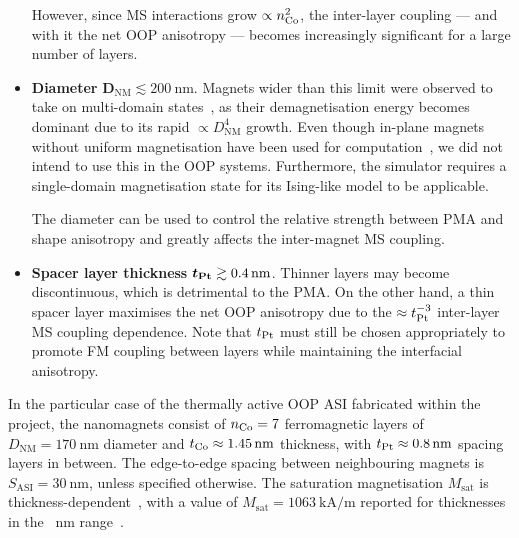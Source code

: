 \begin{itemize}
	However, since MS interactions grow $\propto n_{\ce{Co}}^2$, the inter-layer coupling --- and with it the net OOP anisotropy --- becomes increasingly significant for a large number of layers.
	\item \textbf{Diameter} $\boldsymbol{D_\mathrm{NM}} \lesssim \SI{200}{\nano\metre}$. \newline
	Magnets wider than this limit were observed to take on multi-domain states~\cite{KUR-24}, as their demagnetisation energy becomes dominant due to its rapid $\propto D_\mathrm{NM}^4$ growth.
	Even though in-plane magnets without uniform magnetisation have been used for computation~\cite{gartside2022reconfigurable}, we did not intend to use this in the OOP systems.
	Furthermore, the \hotspice simulator requires a single-domain magnetisation state for its Ising-like model to be applicable. \par
	The diameter can be used to control the relative strength between PMA and shape anisotropy and greatly affects the inter-magnet MS coupling.
	\item \textbf{Spacer layer thickness} $\boldsymbol{t_{\ce{Pt}}} \gtrsim \SI{0.4}{\nano\metre}$. \newline
	Thinner layers may become discontinuous, which is detrimental to the PMA.
	On the other hand, a thin spacer layer maximises the net OOP anisotropy due to the $\approx t_{\ce{Pt}}^{-3}$ inter-layer MS coupling dependence.
	Note that $t_{\ce{Pt}}$ must still be chosen appropriately to promote FM coupling between layers while maintaining the interfacial anisotropy. %
\end{itemize}

In the particular case of the thermally active OOP ASI fabricated within the \spinengine project, the nanomagnets consist of $n_{\ce{Co}}=7$ ferromagnetic layers of $D_\mathrm{NM}=\SI{170}{\nano\metre}$ diameter and $t_{\ce{Co}} \approx \SI{1.45}{\nano\metre}$ thickness, with $t_{\ce{Pt}} \approx \SI{0.8}{\nano\metre}$ spacing layers in between.
The edge-to-edge spacing between neighbouring magnets is $S_\mathrm{ASI}=\SI{30}{\nano\metre}$, unless specified otherwise.
The saturation magnetisation $M_\mathrm{sat}$ is thickness-dependent~\cite{CoFilmPropertiesCVD}, with a value of $M_\mathrm{sat}=\SI{1063}{\kilo\ampere\per\metre}$ reported for thicknesses in the \SI{}{\nano\metre} range~\cite{Msat_Co}.

